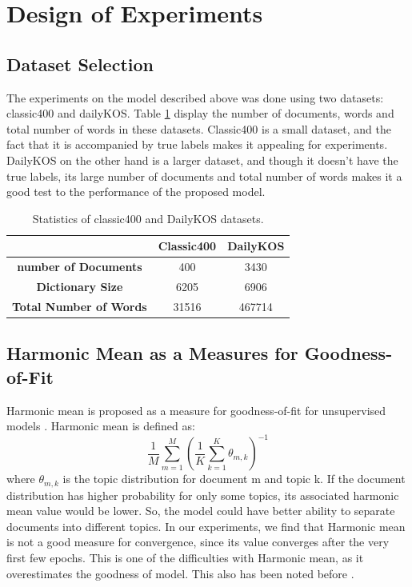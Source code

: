 \documentclass[twoside,12pt]{article}
\begin{document}
\section{Design of Experiments}

\subsection{Dataset Selection}
The experiments on the model described above was done using two datasets: classic400 and dailyKOS. Table \ref{tableDatasetStats} display the number of documents, words and total number of words in these datasets. Classic400 is a small dataset, and the fact that it is accompanied by true labels makes it appealing for experiments. DailyKOS on the other hand is a larger dataset, and though it doesn't have the true labels, its large number of documents and total number of words makes it a good test to the performance of the proposed model. 


\begin{table}
\vspace{-2cm}
\center
\begin{tabular}{|c|c|c|}
\hline
 & \textbf{Classic400} & \textbf{DailyKOS} \\
 \hline
\textbf{ number of Documents} & 400 & 3430 \\
\textbf{ Dictionary Size} & 6205 & 6906 \\
\textbf{ Total Number of Words} & 31516 & 467714\\
 \hline
\end{tabular}
\caption{Statistics of classic400 and DailyKOS datasets.}
\label{tableDatasetStats}
\end{table}

\subsection{Harmonic Mean  as a Measures for Goodness-of-Fit}
Harmonic mean is proposed as a measure for goodness-of-fit for unsupervised models \cite{harmonic}. Harmonic mean is defined as:
\begin{equation}
\frac{1}{M}\sum_{m=1}^{M}(\frac{1}{K}\sum_{k=1}^{K}\theta_{m,k})^{-1}
\end{equation}
where $\theta_{m,k}$ is the topic distribution for document m and topic k. If the document distribution has higher probability for only some topics, its associated harmonic mean value would be lower. So, the model could have better ability to separate documents into different topics. In our experiments, we find that Harmonic mean is not a good measure for convergence, since its value converges after the very first few epochs. This is one of the difficulties with Harmonic mean, as it overestimates the goodness of model. This also has been noted before \cite{wallach}.
\end{document}
